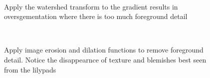 \documentclass[12pt]{article}
\theoremstyle{plain}%
\theoremstyle{definition}
\theoremstyle{remark}
\begin{document}
\begin{figure}[!h]
\centering
\mbox{\quad
{}}
\caption{Apply the watershed transform to the gradient results in oversgementation where there is too much foreground detail}
\end{figure}
\begin{figure}[!h]
\centering
\mbox{\quad
{}}
\caption{Apply image erosion and dilation functions to remove foreground detail. Notice the disappearnce of texture and blemishes best seen from the lilypads}
\end{figure}
\end{document}
